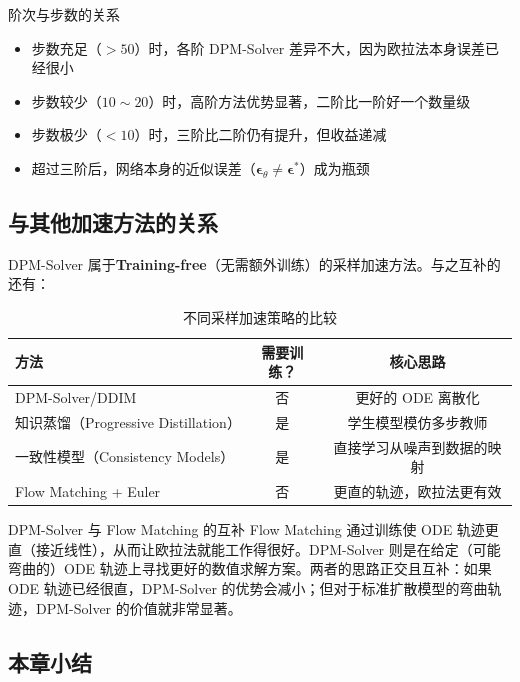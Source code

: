 \documentclass[a4paper]{article}
\begin{document}
\begin{knowledgebox}{阶次与步数的关系}
\begin{itemize}
    \item 步数充足（$>50$）时，各阶 DPM-Solver 差异不大，因为欧拉法本身误差已经很小
    \item 步数较少（$10\sim 20$）时，高阶方法优势显著，二阶比一阶好一个数量级
    \item 步数极少（$<10$）时，三阶比二阶仍有提升，但收益递减
    \item 超过三阶后，网络本身的近似误差（$\boldsymbol{\epsilon}_\theta \neq \boldsymbol{\epsilon}^*$）成为瓶颈
\end{itemize}
\end{knowledgebox}

\subsection{与其他加速方法的关系}

DPM-Solver 属于\textbf{Training-free}（无需额外训练）的采样加速方法。与之互补的还有：

\begin{table}[H]
\centering
\begin{tabular}{lcc}
\toprule
\textbf{方法} & \textbf{需要训练？} & \textbf{核心思路} \\
\midrule
DPM-Solver/DDIM & 否 & 更好的 ODE 离散化 \\
知识蒸馏（Progressive Distillation） & 是 & 学生模型模仿多步教师 \\
一致性模型（Consistency Models） & 是 & 直接学习从噪声到数据的映射 \\
Flow Matching + Euler & 否 & 更直的轨迹，欧拉法更有效 \\
\bottomrule
\end{tabular}
\caption{不同采样加速策略的比较}
\end{table}

\begin{knowledgebox}{DPM-Solver 与 Flow Matching 的互补}
Flow Matching 通过训练使 ODE 轨迹更直（接近线性），从而让欧拉法就能工作得很好。DPM-Solver 则是在给定（可能弯曲的）ODE 轨迹上寻找更好的数值求解方案。两者的思路正交且互补：如果 ODE 轨迹已经很直，DPM-Solver 的优势会减小；但对于标准扩散模型的弯曲轨迹，DPM-Solver 的价值就非常显著。
\end{knowledgebox}

\subsection{本章小结}
\end{document}
